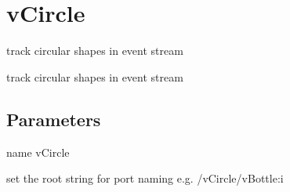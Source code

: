 \hypertarget{group__vCircle}{\section{v\-Circle}
\label{group__vCircle}
}


track circular shapes in event stream  


track circular shapes in event stream \hypertarget{group__vCircle_parameters}{}\subsection{Parameters}\label{group__vCircle_parameters}

\begin{DoxyItemize}
\item {\ttfamily name} {\ttfamily v\-Circle} \par
set the root string for port naming e.\-g. /v\-Circle/v\-Bottle\-:i 
\end{DoxyItemize}